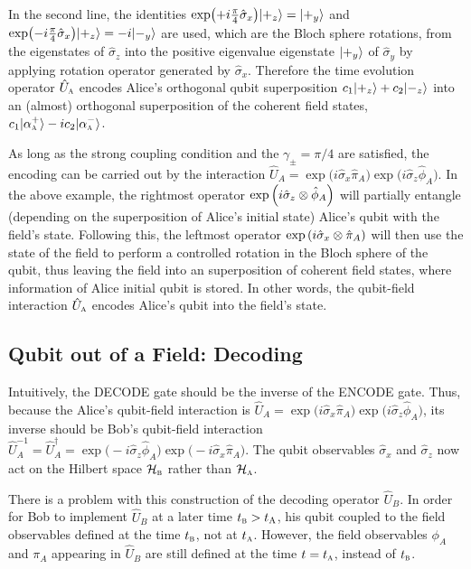 \documentclass[a4paper,12pt]{article}
\begin{document}
In the second line, the identities $\exp(+ i \frac{\pi}{4}\hat\sigma_x) | +_z \rangle = | +_y \rangle $ and $\exp(- i \frac{\pi}{4}\hat\sigma_x) | +_z \rangle =-i | -_y \rangle $ are used, which are the Bloch sphere rotations, from the eigenstates of $\hat\sigma_z$ into the positive eigenvalue eigenstate $ | +_y \rangle $ of $\hat\sigma_y$ by applying rotation operator generated by $\hat\sigma_x$. 
Therefore the time evolution operator $\hat U_\textsc{a}$ encodes Alice's orthogonal qubit superposition $c_1| +_z \rangle +c_2 | -_z \rangle $ into an (almost) orthogonal superposition of the coherent field states, $c_1| \alpha_\textsc{a}^+ \rangle- i c_2 | \alpha_\textsc{a}^{-} \rangle $.

As long as the strong coupling condition and the $\gamma_{ \pm } = \pi / 4$ are satisfied, the encoding can be carried out by the interaction $\hat U_A = \exp\big(i\hat\sigma_x\hat \pi_A\big)\exp\big(i\hat\sigma_z\hat \phi_A \big)$. 
In the above example, the rightmost operator $\exp\left( i\hat\sigma_z \otimes \hat \phi_A \right)$ will partially entangle (depending on the superposition of Alice's initial state) Alice's qubit with the field's state. 
Following this, the leftmost operator $\exp\left( i \hat \sigma_x \otimes \hat\pi_A \right)$ will then use the state of the field to perform a controlled rotation in the Bloch sphere of the qubit, thus leaving the field into an superposition of coherent field states, where information of Alice initial qubit is stored. 
In other words, the qubit-field interaction $\hat U_\textsc{a}$ encodes Alice's qubit into the field's state.

\subsection*{Qubit out of a Field: Decoding}

Intuitively, the DECODE gate should be the inverse of the ENCODE gate. 
Thus, because the Alice's qubit-field interaction is $\hat U_A=\exp\big(i\hat\sigma_x\hat \pi_A\big)\exp\big(i\hat\sigma_z \hat \phi_A\big)$, its inverse should be Bob's qubit-field interaction $\hat U_A^{-1}=\hat U_A^\dagger=\exp\big(-i\hat\sigma_z \hat \phi_A\big)\exp\big(-i\hat\sigma_x \hat\pi_A\big)$. 
The qubit observables $\hat\sigma_x$ and $\hat\sigma_z$ now act on the Hilbert space $\mathcal H_\textsc{b}$ rather than $\mathcal H_\textsc{a}$.

There is a problem with this construction of the decoding operator $\hat U_B$. 
In order for Bob to implement $\hat U_B$ at a later time $t_\textsc{b} > t_\textsc{A}$, his qubit coupled to the field observables defined at the time $t_\textsc{b}$, not at $t_\textsc{a}$. 
However, the field observables $\phi_A$ and $\pi_A$ appearing in $\hat U_B$ are still defined at the time $ t = t_\textsc{a}$, instead of $t_\textsc{b}$. 
\end{document}
